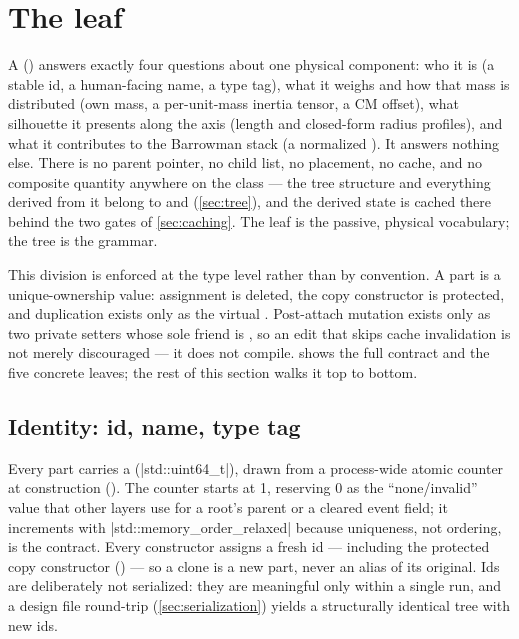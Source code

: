 \section[The Part leaf]{The  leaf}\label{sec:leaf}

A  () answers exactly four questions about one physical
component: who it is (a stable id, a human-facing name, a type tag), what it weighs and how that
mass is distributed (own mass, a per-unit-mass inertia tensor, a CM offset), what silhouette it
presents along the axis (length and closed-form radius profiles), and what it contributes to the
Barrowman stack (a normalized ). It answers nothing else. There is no parent
pointer, no child list, no placement, no cache, and no composite quantity anywhere on the class ---
the tree structure and everything derived from it belong to  and 
(\cref{sec:tree}), and the derived state is cached there behind the two gates of
\cref{sec:caching}. The leaf is the passive, physical vocabulary; the tree is the grammar.

This division is enforced at the type level rather than by convention. A part is a
unique-ownership value: assignment is deleted, the copy constructor is protected, and duplication
exists only as the virtual . Post-attach mutation exists only as two private setters
whose sole friend is , so an edit that skips cache invalidation is not merely
discouraged --- it does not compile.  shows the full contract and the five
concrete leaves; the rest of this section walks it top to bottom.


\subsection{Identity: id, name, type tag}\label{sec:leaf-identity}

Every part carries a  (\cppinline|std::uint64_t|), drawn from a process-wide atomic
counter at construction (). The counter starts at 1, reserving 0 as
the ``none/invalid'' value that other layers use for a root's parent or a cleared event field; it
increments with \cppinline|std::memory_order_relaxed| because uniqueness, not ordering, is the
contract. Every constructor assigns a fresh id --- including the protected copy constructor
() --- so a clone is a new part, never an alias of its original.
Ids are deliberately not serialized: they are meaningful only within a single run, and a design
file round-trip (\cref{sec:serialization}) yields a structurally identical tree with new ids.


